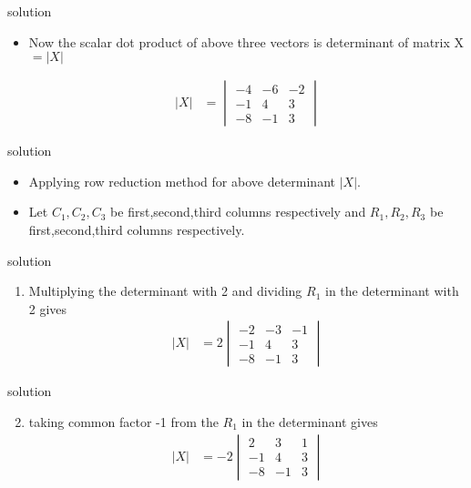 \documentclass{beamer}
\begin{document}
 
 \begin{frame}{solution}
 \begin{itemize}
 \item 
 Now the scalar dot product of above three vectors is determinant of matrix X 
 $=|X|$ 
 
     \begin{align}
        |X| & = \begin{vmatrix}
                -4 & -6 & -2\\
                -1 & 4 & 3\\
                -8 & -1 & 3\nonumber
                \end{vmatrix}
\end{align}
\end{itemize}
\end{frame}


\begin{frame}{solution}
\begin{itemize}
    \item Applying row reduction method for above determinant $|X|$.\\
    \item Let $C_1,C_2,C_3$ be first,second,third columns respectively and $R_1,R_2,R_3$ be first,second,third columns respectively.
    \end{itemize}
\end{frame}


\begin{frame}{solution}
\begin{enumerate}
    \item Multiplying the determinant with 2 and dividing $R_1$ in the determinant with 2 gives
    \begin{align}
        |X|  & = 2\begin{vmatrix}
                -2 & -3 & -1\\
                -1 & 4 & 3\\
                -8 & -1 & 3
                \end{vmatrix}
\end{align}
\end{enumerate}
\end{frame}


\begin{frame}{solution}
\begin{enumerate}
\setcounter{enumi}{1}
\item taking common factor -1 from the $R_1$ in the determinant gives
\begin{align}
        |X| & = -2\begin{vmatrix}
                 2 & 3 & 1\\
                 -1 & 4 & 3\\
                 -8 & -1 & 3
                 \end{vmatrix}
\end{align}
\end{enumerate}
\end{frame}
\end{document}
